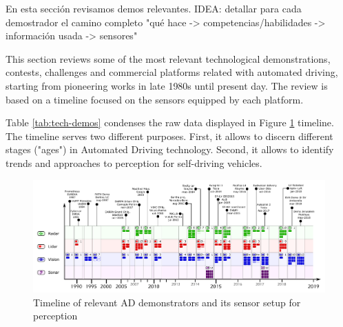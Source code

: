
En esta sección revisamos demos relevantes.
IDEA: detallar para cada demostrador el camino completo "qué hace -> competencias/habilidades -> información usada -> sensores"

This section reviews some of the most relevant technological demonstrations,
contests, challenges and commercial platforms related with automated driving, 
starting from pioneering works in late 1980s until present day. The review is
based on a timeline focused on the sensors equipped by each platform.

Table \ref{tab:tech-demos} condenses the raw data displayed in Figure 
\ref{fig:tech-demos} timeline. The timeline serves two different purposes. 
First, it allows to discern different stages ("ages") in Automated Driving 
technology. Second, it allows to identify trends and approaches to perception 
for self-driving vehicles.



\begin{figure}[h]
\centering
\includegraphics[width=0.95\textheight,angle=90,keepaspectratio]{"img/AD_Timeline_2"}
\caption{Timeline of relevant AD demonstrators and its sensor setup for 
perception}
\label{fig:tech-demos}
\end{figure}

